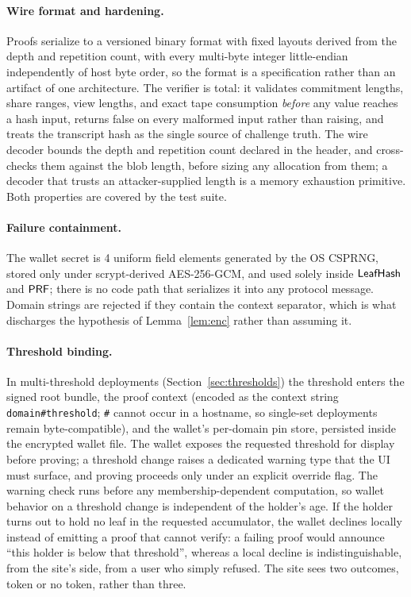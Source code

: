 \documentclass[11pt]{article}
\theoremstyle{definition}
\begin{document}
\paragraph{Wire format and hardening.} Proofs serialize to a versioned binary format with
fixed layouts derived from the depth and repetition count, with every multi-byte integer
little-endian independently of host byte order, so the format is a specification rather
than an artifact of one architecture. The verifier is total: it validates commitment
lengths, share ranges, view lengths, and exact tape consumption \emph{before} any value
reaches a hash input, returns false on every malformed input rather than raising, and
treats the transcript hash as the single source of challenge truth. The wire decoder
bounds the depth and repetition count declared in the header, and cross-checks them
against the blob length, before sizing any allocation from them; a decoder that trusts an
attacker-supplied length is a memory exhaustion primitive. Both properties are covered by
the test suite.

\paragraph{Failure containment.} The wallet secret is 4 uniform field elements generated
by the OS CSPRNG, stored only under scrypt-derived AES-256-GCM, and used solely inside
$\mathsf{LeafHash}$ and $\mathsf{PRF}$; there is no code path that serializes it into any protocol
message. Domain strings are rejected if they contain the context separator, which is what
discharges the hypothesis of Lemma~\ref{lem:enc} rather than assuming it.

\paragraph{Threshold binding.} In multi-threshold deployments
(Section~\ref{sec:thresholds}) the threshold enters the signed root bundle, the proof
context (encoded as the context string \texttt{domain\#threshold}; \texttt{\#} cannot
occur in a hostname, so single-set deployments remain byte-compatible), and the wallet's
per-domain pin store, persisted inside the encrypted wallet file. The wallet exposes the
requested threshold for display before proving; a threshold change raises a dedicated
warning type that the UI must surface, and proving proceeds only under an explicit
override flag. The warning check runs before any membership-dependent computation, so
wallet behavior on a threshold change is independent of the holder's age. If the holder
turns out to hold no leaf in the requested accumulator, the wallet declines locally
instead of emitting a proof that cannot verify: a failing proof would announce ``this
holder is below that threshold'', whereas a local decline is indistinguishable, from the
site's side, from a user who simply refused. The site sees two outcomes, token or no
token, rather than three.
\end{document}

